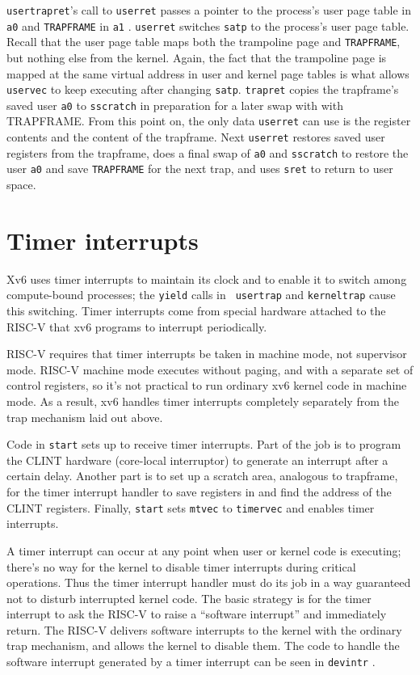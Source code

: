 {\tt usertrapret}'s call to {\tt userret} passes a pointer to the process's user
page table in {\tt a0} and {\tt TRAPFRAME} in {\tt a1}
.
{\tt userret} switches {\tt satp} to the process's user page table.
Recall that the user page table maps both the trampoline page
and {\tt TRAPFRAME}, but nothing else from the kernel.
Again, the fact that the trampoline page is mapped at the same
virtual address in user and kernel page tables is what allows
{\tt uservec} to keep executing after changing {\tt satp}.
{\tt trapret} copies the trapframe's saved user {\tt a0} to {\tt sscratch}
in preparation for a later swap with with TRAPFRAME.
From this point on, the only data {\tt userret} can use is
the register contents and the content of the trapframe.
Next {\tt userret} restores saved user registers from the trapframe,
does a final swap of {\tt a0} and {\tt sscratch} to restore the
user {\tt a0} and save {\tt TRAPFRAME} for the next trap,
and uses {\tt sret} to return to user space.

\section{Timer interrupts}

Xv6 uses timer interrupts to maintain its clock and to enable it to
switch among compute-bound processes; the {\tt yield} calls in {\tt
  usertrap} and {\tt kerneltrap} cause this switching. Timer
interrupts come from special hardware attached to the RISC-V that xv6
programs to interrupt periodically.

RISC-V requires that timer interrupts be taken in machine mode, not
supervisor mode. RISC-V machine mode executes without paging, and with
a separate set of control registers, so it's not practical to run
ordinary xv6 kernel code in machine mode. As a result, xv6 handles
timer interrupts completely separately from the trap mechanism laid out
above.

Code in {\tt start}
sets up to receive timer interrupts.
Part of the job is to program the CLINT hardware (core-local interruptor)
to generate an interrupt after a certain delay.
Another part is to set up a scratch area, analogous to trapframe,
for the timer interrupt handler to save registers in and find
the address of the CLINT registers.
Finally, {\tt start} sets {\tt mtvec} to {\tt timervec} and
enables timer interrupts.

A timer interrupt can occur at any point when user or kernel code is
executing; there's no way for the kernel to disable timer interrupts
during critical operations. Thus the timer interrupt handler must do
its job in a way guaranteed not to disturb interrupted kernel code.
The basic strategy is for the timer interrupt to ask the RISC-V to
raise a ``software interrupt'' and immediately return. The RISC-V
delivers software interrupts to the kernel with the ordinary trap
mechanism, and allows the kernel to disable them. The code to
handle the software interrupt generated by a timer interrupt can be
seen in {\tt devintr} .

